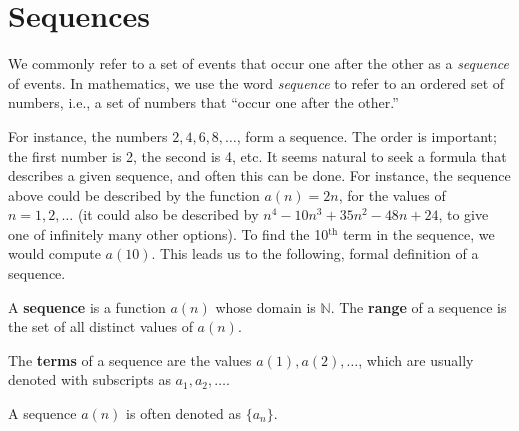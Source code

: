 
\section{Sequences}\label{sec:sequences}

We commonly refer to a set of events that occur one after the other as a \emph{sequence} of events. In mathematics, we use the word \emph{sequence} to refer to an ordered set of numbers, i.e., a set of numbers that ``occur one after the other.''

For instance, the numbers $2, 4, 6, 8, \dotsc$, form a sequence. The order is important; the first number is 2, the second is 4, etc. It seems natural to seek a formula that describes a given sequence, and often this can be done. For instance, the sequence above could be described by the function $a(n) = 2n$, for the values of $n = 1, 2, \dotsc$ (it could also be described by $n^4-10 n^3+35 n^2-48n+24$, to give one of infinitely many other options). To find the 10$^\text{th}$ term in the sequence, we would compute $a(10)$. This leads us to the following, formal definition of a sequence.

\begin{definition}[Sequence]\label{def:sequence}%
%
%
A \textbf{sequence} is a function $a(n)$ whose domain is $\mathbb{N}$. The \textbf{range} of a sequence is the set of all distinct values of $a(n)$.
\bigskip

The \textbf{terms} of a sequence are the values $a(1), a(2), \dotsc$, which are usually denoted with subscripts as $a_1, a_2, \dotsc$.\bigskip

A sequence $a(n)$ is often denoted as $\{a_n\}$.
\end{definition}



